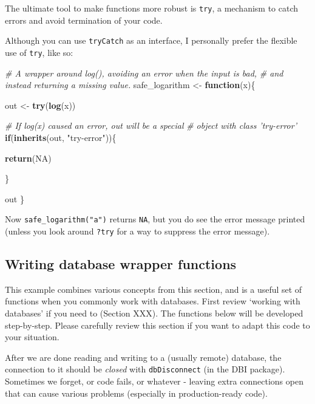 \documentclass[]{book}
\newenvironment{Shaded}{\begin{snugshade}}{\end{snugshade}}
\newcommand{\CommentTok}[1]{\textcolor[rgb]{0.56,0.35,0.01}{\textit{#1}}}
\newcommand{\ControlFlowTok}[1]{\textcolor[rgb]{0.13,0.29,0.53}{\textbf{#1}}}
\newcommand{\KeywordTok}[1]{\textcolor[rgb]{0.13,0.29,0.53}{\textbf{#1}}}
\newcommand{\NormalTok}[1]{#1}
\newcommand{\OtherTok}[1]{\textcolor[rgb]{0.56,0.35,0.01}{#1}}
\newcommand{\StringTok}[1]{\textcolor[rgb]{0.31,0.60,0.02}{#1}}
\begin{document}
The ultimate tool to make functions more robust is \texttt{try}, a mechanism to catch errors and avoid termination of your code.

Although you can use \texttt{tryCatch} as an interface, I personally prefer the flexible use of \texttt{try}, like so:

\begin{Shaded}
\begin{Highlighting}[]
\CommentTok{# A wrapper around log(), avoiding an error when the input is bad,}
\CommentTok{# and instead returning a missing value.}
\NormalTok{safe_logarithm <-}\StringTok{ }\ControlFlowTok{function}\NormalTok{(x)\{}
  
\NormalTok{  out <-}\StringTok{ }\KeywordTok{try}\NormalTok{(}\KeywordTok{log}\NormalTok{(x))}
  
  \CommentTok{# If log(x) caused an error, out will be a special }
  \CommentTok{# object with class 'try-error'}
  \ControlFlowTok{if}\NormalTok{(}\KeywordTok{inherits}\NormalTok{(out, }\StringTok{"try-error"}\NormalTok{))\{}
    
    \KeywordTok{return}\NormalTok{(}\OtherTok{NA}\NormalTok{)}
    
\NormalTok{  \}}
  
\NormalTok{out}
\NormalTok{\}}
\end{Highlighting}
\end{Shaded}

Now \texttt{safe\_logarithm("a")} returns \texttt{NA}, but you do see the error message printed (unless you look around \texttt{?try} for a way to suppress the error message).

\hypertarget{writing-database-wrapper-functions}{%
\subsection{Writing database wrapper functions}\label{writing-database-wrapper-functions}}

This example combines various concepts from this section, and is a useful set of functions when you commonly work with databases. First review `working with databases' if you need to (Section XXX). The functions below will be developed step-by-step. Please carefully review this section if you want to adapt this code to your situation.

After we are done reading and writing to a (usually remote) database, the connection to it should be \emph{closed} with \texttt{dbDisconnect} (in the DBI package). Sometimes we forget, or code fails, or whatever - leaving extra connections open that can cause various problems (especially in production-ready code).
\end{document}
